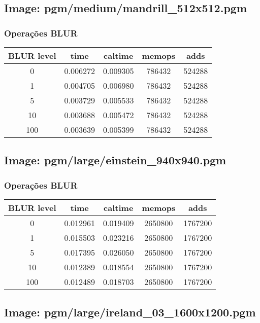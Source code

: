 \documentclass{report}
\begin{document}
\subsection*{Image: pgm/medium/mandrill\_512x512.pgm}

\subsubsection*{Operações BLUR}
\begin{tabular}{ccccc}
\toprule
\textbf{BLUR level} & \textbf{time} & \textbf{caltime} & \textbf{memops} & \textbf{adds} \\
\midrule
0 & 0.006272 & 0.009305 & 786432 & 524288 \\
1 & 0.004705 & 0.006980 & 786432 & 524288 \\
5 & 0.003729 & 0.005533 & 786432 & 524288 \\
10 & 0.003688 & 0.005472 & 786432 & 524288 \\
100 & 0.003639 & 0.005399 & 786432 & 524288 \\
\bottomrule
\end{tabular}

\subsection*{Image: pgm/large/einstein\_940x940.pgm}

\subsubsection*{Operações BLUR}
\begin{tabular}{ccccc}
\toprule
\textbf{BLUR level} & \textbf{time} & \textbf{caltime} & \textbf{memops} & \textbf{adds} \\
\midrule
0 & 0.012961 & 0.019409 & 2650800 & 1767200 \\
1 & 0.015503 & 0.023216 & 2650800 & 1767200 \\
5 & 0.017395 & 0.026050 & 2650800 & 1767200 \\
10 & 0.012389 & 0.018554 & 2650800 & 1767200 \\
100 & 0.012489 & 0.018703 & 2650800 & 1767200 \\
\bottomrule
\end{tabular}

\subsection*{Image: pgm/large/ireland\_03\_1600x1200.pgm}
\end{document}
